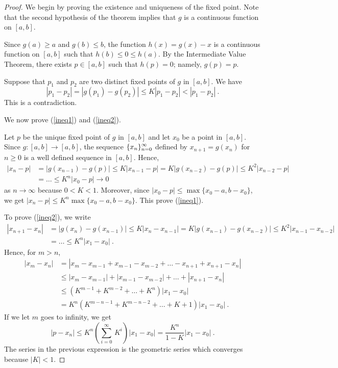 \begin{proof}
We begin by proving the existence and uniqueness of the fixed point.
Note that the second hypothesis of the theorem implies that $g$ is a
continuous function on $[a,b]$.

Since $g(a) \geq a$ and $g(b) \leq b$, the function $h(x) = g(x) -x$
is a continuous function on $[a,b]$ such that $h(b) \leq 0 \leq h(a)$.
By the Intermediate Value Theorem, there exists $p \in [a,b]$ such
that $h(p) = 0$; namely, $g(p) = p$.

Suppose that $p_1$ and $p_2$ are two distinct fixed points of $g$ in
$[a,b]$.  We have
\[
|p_1 -p_2| = |g(p_1) - g(p_2)| \leq K|p_1 - p_2| < |p_1 - p_2| \ .
\]
This is a contradiction.

\noindent We now prove (\ref{ineq1}) and (\ref{ineq2}).

Let $p$ be the unique fixed point of $g$ in $[a,b]$ and let $x_0$ be a
point in $[a,b]$.  Since $g:[a,b] \rightarrow [a,b]$, the sequence
$\displaystyle \{x_n\}_{n=0}^\infty$ defined by $x_{n+1} = g(x_n)$ for
$n \geq 0$ is a well defined sequence in $[a,b]$.  Hence,
\[
\begin{split}
|x_n -p| &= |g(x_{n-1}) - g(p)| \leq K |x_{n-1} - p|
= K |g(x_{n-2}) - g(p)| \leq K^2 |x_{n-2} -p| \\
&= \ldots \leq K^n |x_0 - p| \rightarrow 0
\end{split}
\]
as $n \rightarrow \infty$ because $0<K<1$.
Moreover, since $|x_0 -p| \leq \max\{x_0 -a, b-x_0\}$, we get
$|x_n -p| \leq K^n \max\{x_0 -a,b - x_0\}$.  This prove (\ref{ineq1}).

To prove (\ref{ineq2}), we write
\[
\begin{split}
|x_{n+1} -x_n| &= |g(x_n) - g(x_{n-1})| \leq K |x_n - x_{n-1}|
= K |g(x_{n-1}) - g(x_{n-2})| \leq K^2 |x_{n-1} -x_{n-2}|\\
&= \ldots \leq K^n |x_1 - x_0| \ .
\end{split}
\]
Hence, for $m > n$,
\[
\begin{split}
|x_m - x_n| &= |x_m - x_{m-1} + x_{m-1} - x_{m-2} + \ldots - x_{n+1} +
x_{n+1} - x_n | \\
&\leq |x_m - x_{m-1}| + |x_{m-1} - x_{m-2}| + \ldots + |x_{n+1} - x_n| \\
&\leq (K^{m-1} + K^{m-2} + \ldots + K^n)|x_1 - x_0|\\
&= K^n(K^{m-n-1} + K^{m-n-2} + \ldots + K + 1)|x_1 - x_0| \ .
\end{split}
\]
If we let $m$ goes to infinity, we get
\[
|p - x_n| \leq K^n\left( \sum_{i=0}^\infty \, K^i\right)|x_1 - x_0| =
\frac{K^n}{1-K} |x_1 - x_0| \ .
\]
The series in the previous expression is the geometric series which
converges because $|K|<1$.
\end{proof}

